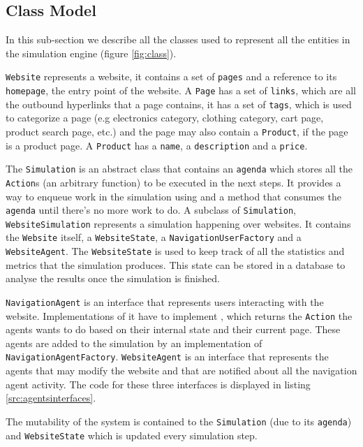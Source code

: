 \subsection{Class Model}

In this sub-section we describe all the classes used to represent all the 
entities in the simulation engine (figure \ref{fig:class}).

\texttt{Website} represents a website, it contains a set of \texttt{pages} and 
a reference to its \texttt{homepage}, the entry point of the website. A 
\texttt{Page} has a set of \texttt{links}, which are all the outbound 
hyperlinks that a page contains, it has a set of \texttt{tags}, which is used 
to categorize a page (e.g electronics category, clothing category, cart page, 
product search page, etc.) and the page may also contain a \texttt{Product}, if 
the page is a product page. A \texttt{Product} has a \texttt{name}, a 
\texttt{description} and a \texttt{price}.

The \texttt{Simulation} is an abstract class that contains an \texttt{agenda} 
which stores all the \texttt{Action}s (an arbitrary function) to be executed in 
the next steps. It provides a way to enqueue work in the simulation using 
 and a  method that consumes 
the \texttt{agenda} until there's no more work to do. A subclass of 
\texttt{Simulation}, \texttt{WebsiteSimulation} represents a simulation 
happening over websites. It contains the \texttt{Website} itself, a 
\texttt{WebsiteState}, a \texttt{NavigationUserFactory} and a 
\texttt{WebsiteAgent}. The \texttt{WebsiteState} is used to keep track of all 
the statistics and metrics that the simulation produces. This state can be 
stored in a database to analyse the results once the simulation is finished.

\texttt{NavigationAgent} is an interface that represents users interacting with 
the website. Implementations of it have to implement , 
which returns the \texttt{Action} the agents wants to do based on their 
internal state and their current page. These agents are added to the simulation 
by an implementation of \texttt{NavigationAgentFactory}. \texttt{WebsiteAgent} 
is an interface that represents the agents that may modify the website and that 
are notified about all the navigation agent activity. The code for these three 
interfaces is displayed in listing \ref{src:agentsinterfaces}.

The mutability of the system is contained to the \texttt{Simulation} (due to 
its \texttt{agenda}) and \texttt{WebsiteState} which is updated every 
simulation step.


